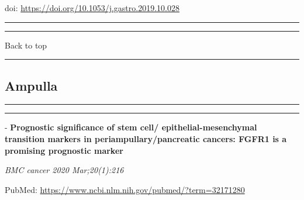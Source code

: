 \documentclass[
]{article}
\begin{document}
doi: \url{https://doi.org/10.1053/j.gastro.2019.10.028}

\begin{center}\rule{0.5\linewidth}{0.5pt}\end{center}

\begin{center}\rule{0.5\linewidth}{0.5pt}\end{center}

Back to top

\begin{center}\rule{0.5\linewidth}{0.5pt}\end{center}

\pagebreak

\hypertarget{ampulla}{%
\subsection{Ampulla}\label{ampulla}}

\begin{center}\rule{0.5\linewidth}{0.5pt}\end{center}

\begin{center}\rule{0.5\linewidth}{0.5pt}\end{center}

- \textbf{Prognostic significance of stem cell/ epithelial-mesenchymal
transition markers in periampullary/pancreatic cancers: FGFR1 is a
promising prognostic marker}

\emph{BMC cancer 2020 Mar;20(1):216}

PubMed: \url{https://www.ncbi.nlm.nih.gov/pubmed/?term=32171280}
\end{document}
